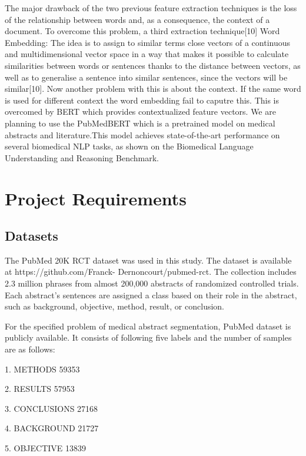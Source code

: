 \documentclass[12pt,a4paper]{report}     %
\begin{document}
\begin{normalsize}
{\break
\break
The major drawback of the two previous feature extraction techniques is the loss of the
relationship between words and, as a consequence, the context of a document. To overcome this problem,  a third extraction technique[10]
Word Embedding: The idea is to assign to similar terms close vectors of a continuous
and multidimensional vector space in a way that makes it possible to calculate similarities
between words or sentences thanks to the distance between vectors, as well as to
generalise a sentence into similar sentences, since the vectors will be similar[10].
Now another problem with this is about the context. If the same word is used for different context the word embedding fail to caputre this. 
This is overcomed by BERT which provides contextualized feature vectors.
We are planning to use the PubMedBERT which is a pretrained model on medical abstracts and literature.This model achieves state-of-the-art performance on several biomedical NLP tasks, as shown on the Biomedical Language Understanding and Reasoning Benchmark.
\\


\newpage
\section{Project Requirements}


\subsection{Datasets}
The PubMed 20K RCT dataset was used in this study. The dataset is available at https://github.com/Franck- Dernoncourt/pubmed-rct.
The collection includes 2.3 million phrases from almost 200,000 abstracts of randomized controlled trials. Each abstract's sentences are assigned a class based on their role in the abstract, such as background, objective, method, result, or conclusion.


For the specified problem of medical abstract segmentation, PubMed dataset is publicly available. It consists of following five labels and the number of samples are as follows:

1. METHODS          59353

2. RESULTS          57953

3. CONCLUSIONS      27168

4. BACKGROUND       21727

5. OBJECTIVE        13839

}
\end{normalsize}
\end{document}
